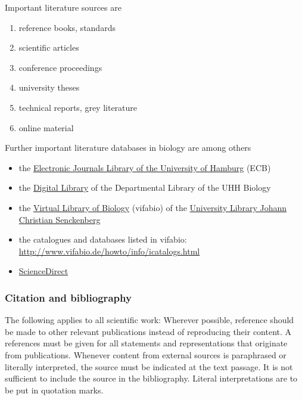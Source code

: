 \documentclass[a4paper,12pt]{article}
\providecommand{\tightlist}{%
  \setlength{\itemsep}{0pt}\setlength{\parskip}{0pt}}
\begin{document}
Important literature sources are
\begin{enumerate}
\def\labelenumi{\arabic{enumi}.}
\tightlist
\item
  reference books, standards
\item
  scientific articles
\item
  conference proceedings
\item
  university theses
\item
  technical reports, grey literature
\item
  online material
\end{enumerate}
Further important literature databases in biology are among others
\begin{itemize}
\tightlist
\item
  the \href{https://www.sub.uni-hamburg.de/recherche/elektronische-zeitschriftenbibliothek.html}{Electronic Journals Library of the University of Hamburg} (ECB)
\item
  the \href{https://www.biologie.uni-hamburg.de/service/bibliotheken/bibliothek-fachbereichsbibliothek/digibib.html}{Digital Library} of the Departmental Library of the UHH Biology
\item
  the \href{http://www.vifabio.de/}{Virtual Library of Biology} (vifabio) of the \href{https://www.ub.uni-frankfurt.de/}{University Library Johann Christian Senckenberg}
\item
  the catalogues and databases listed in vifabio: \url{http://www.vifabio.de/howto/info/icatalogs.html}
\item
  \href{https://www.sciencedirect.com}{ScienceDirect}
\end{itemize}
\hypertarget{citation-and-bibliography}{%
\subsubsection{Citation and bibliography}\label{citation-and-bibliography}}

The following applies to all scientific work: Wherever possible, reference should be made to other relevant publications instead of reproducing their content. A references must be given for all statements and representations that originate from publications. Whenever content from external sources is paraphrased or literally interpreted, the source must be indicated at the text passage. It is not sufficient to include the source in the bibliography. Literal interpretations are to be put in quotation marks.
\end{document}

